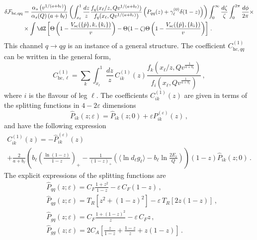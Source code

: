 \begin{equation}
\label{eq:dFhc-qq}
\begin{aligned}
\delta \mathcal{F}_{\mathrm{hc,qq}} &= \frac{\alpha_s\left(v^{1/(a+b_\ell)}\right)}{\alpha_s(Q)\left(a+b_\ell\right)}\left(\int_{x_\ell}^1 \frac{dz}{z}\frac{f_q(x_\ell/z,Qv^{1/(a+b_\ell)})}{f_q(x_\ell,Qv^{1/(a+b_\ell)})} \left(P_{qq}(z)+\gamma^{(0)}_\ell\delta(1-z)\right)\right)\int_0^\infty\frac{d\zeta}{\zeta}\int_0^{2\pi}\frac{d\phi}{2\pi}\times \\
&\times \int \dZ   \left[\Theta\left(1-\frac{V_{\mathrm{sc}}(\{\tilde{p}\},k,\{k_i\})}{v}\right) -\Theta(1-\zeta)\Theta\left(1-\frac{V_{\mathrm{sc}}(\{\tilde{p}\},\{k_i\})}{v}\right)\right]\,.
\end{aligned}
\end{equation} 
 This channel $q\to qg$ is an instance of a
general structure. The coefficient $C^{(1)}_{\mathrm{hc}, qq}$ can be written in the general form,
  \begin{equation}
    \label{eq:Cell-ISR}
    C_{\mathrm{hc},\ell}^{(1)} = \sum_k  \int_{x_\ell}^1\frac{dz}{z}\,C_{ik}^{(1)}(z) \frac{f_k(x_\ell/z,Qv^{\frac{1}{a+b_\ell}})}{f_i(x_\ell,Qv^{\frac{1}{a+b_\ell}})}\,,
  \end{equation}
  where $i$ is the flavour of leg $\ell$. 
  The coefficients $C_{ik}^{(1)}(z)$ are given in terms of the splitting functions in $4-2\varepsilon$ dimensions
  \begin{equation}
    \label{eq:Pij-general}
    \hat P_{ik}(z;\varepsilon)= \hat P_{ik}(z;0)+\varepsilon P_{ik}^{(\varepsilon)}(z)\,,
  \end{equation}
  and have the following expression
  \begin{multline}
    \label{eq:Cij-ISR}
    C_{ik}^{(1)}(z) = -\hat P_{ik}^{(\varepsilon)}(z) \\ +\frac{2 }{a+b_\ell}\left(b_\ell\left(\frac{\ln(1-z)}{1-z}\right)_+-\frac{1}{(1-z)_+}
      \left(\langle\ln d_\ell g_\ell\rangle-b_\ell \ln\frac{2E_\ell}{Q}\right)\right)(1-z)\hat P_{ik}(z;0)\,.
  \end{multline}
  The explicit expressions of the splitting
  functions are
  \begin{subequations}
  	\begin{align}
	& \hat P_{qq}(z;\varepsilon)=C_F \frac{1+z^2}{1-z}-\varepsilon\,C_F (1-z)\,,\\
	& \hat P_{qg}(z;\varepsilon)=T_R \left[z^2+(1-z)^2\right]-\varepsilon\,T_R\left[2z(1-z)\right]\,, \\
	  \label{eq:Pgq-epsilon}
	& \hat P_{gq}(z;\varepsilon) =C_F \frac{1 + (1-z)^2}{z} - \varepsilon\,C_Fz \,, \\
	 \label{eq:Pgg-epsilon}
	& \hat P_{gg}(z;\varepsilon) =2C_A\left[\frac{z}{1-z} + \frac{1-z}{z} + z(1-z)\right]\,.
	\end{align}
  \end{subequations}
